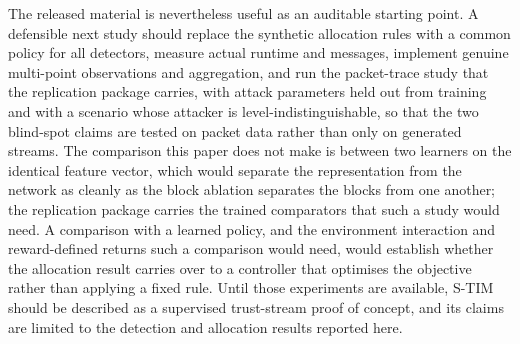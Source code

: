 \documentclass[notspecified,article,submit,moreauthors]{Definitions/mdpi}
\begin{document}
The released material is nevertheless useful as an auditable starting point. A defensible next study should replace the synthetic allocation rules with a common policy for all detectors, measure actual runtime and messages, implement genuine multi-point observations and aggregation, and run the packet-trace study that the replication package carries, with attack parameters held out from training and with a scenario whose attacker is level-indistinguishable, so that the two blind-spot claims are tested on packet data rather than only on generated streams. The comparison this paper does not make is between two learners on the identical feature vector, which would separate the representation from the network as cleanly as the block ablation separates the blocks from one another; the replication package carries the trained comparators that such a study would need. A comparison with a learned policy, and the environment interaction and reward-defined returns such a comparison would need, would establish whether the allocation result carries over to a controller that optimises the objective rather than applying a fixed rule. Until those experiments are available, S-TIM should be described as a supervised trust-stream proof of concept, and its claims are limited to the detection and allocation results reported here.

\vspace{6pt} 



\end{document}
